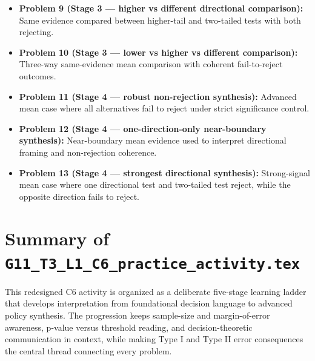 \begin{itemize}
    \item \textbf{Problem 9 (Stage 3 --- higher vs different directional comparison):} Same evidence compared between higher-tail and two-tailed tests with both rejecting.
    \item \textbf{Problem 10 (Stage 3 --- lower vs higher vs different comparison):} Three-way same-evidence mean comparison with coherent fail-to-reject outcomes.
    \item \textbf{Problem 11 (Stage 4 --- robust non-rejection synthesis):} Advanced mean case where all alternatives fail to reject under strict significance control.
    \item \textbf{Problem 12 (Stage 4 --- one-direction-only near-boundary synthesis):} Near-boundary mean evidence used to interpret directional framing and non-rejection coherence.
    \item \textbf{Problem 13 (Stage 4 --- strongest directional synthesis):} Strong-signal mean case where one directional test and two-tailed test reject, while the opposite direction fails to reject.
\end{itemize}

\section{Summary of \texttt{G11\_T3\_L1\_C6\_practice\_activity.tex}}
This redesigned C6 activity is organized as a deliberate five-stage learning ladder that develops interpretation from foundational decision language to advanced policy synthesis. The progression keeps sample-size and margin-of-error awareness, p-value versus threshold reading, and decision-theoretic communication in context, while making Type I and Type II error consequences the central thread connecting every problem.

